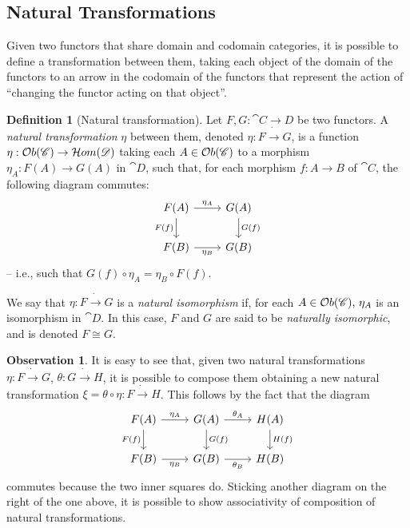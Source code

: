 \documentclass[a4paper, twoside,openright]{report}
\theoremstyle{plain}
\theoremstyle{definition}
\newtheorem{definition}[theorem]{Definition}
\newtheorem{obs}[theorem]{Observation}
\begin{document}
\subsection{Natural Transformations}

Given two functors that share domain and codomain categories, it is possible to define a transformation between them, taking each object of the domain of the functors to an arrow in the codomain of the functors that represent the action of ``changing the functor acting on that object''.

\begin{definition}[Natural transformation]
    Let $F,G : \cat {C \rightarrow D}$ be two functors. A \emph{natural transformation} $\eta$ between them, denoted $\eta: F \dot\rightarrow G$, is a function $\eta: \mathcal{O}b(\mathscr{C}) \rightarrow \mathcal{H}om(\mathscr{D})$ taking each $A \in \mathcal{O}b(\mathscr{C})$ to a morphism $\eta_A:F(A) \rightarrow G(A)$ in $\cat{D}$, such that, for each morphism $f: A \rightarrow B$ of $\cat C$, the following diagram commutes:
    \[
        \begin{tikzcd}
            F(A) \arrow[d, "F(f)" swap] \arrow[r, "{\eta_A}"] & G(A) \arrow[d, "G(f)"] \\
            F(B) \arrow[r, "{\eta_B}"swap] & G(B)
        \end{tikzcd}
    \]
    -- i.e., such that $G(f) \circ \eta_A = \eta_B \circ F(f)$.

    We say that $\eta: F \dot\rightarrow G$ is a \emph{natural isomorphism} if, for each $A \in \mathcal{O}b(\mathscr{C}) \text{, } \eta_A$ is an isomorphism in $\cat D$. In this case, $F$ and $G$ are said to be \emph{naturally isomorphic}, and is denoted $F \cong G$.    
\end{definition}

\begin{obs}\label{obs:comp_assoc_nat_tran}
It is easy to see that, given two natural transformations $\eta:F\dot\rightarrow G$, $\theta: G \dot\rightarrow H$, it is possible to compose them obtaining a new natural transformation $\xi = \theta \circ \eta : F \dot \rightarrow H$. This follows by the fact that the diagram
\[
        \begin{tikzcd}
            F(A) \arrow[d, "F(f)" swap] \arrow[r, "{\eta_A}"] 
                & G(A) \arrow[d, "G(f)"] \arrow[r, "{\theta_A}"]
                & H(A) \arrow[d, "H(f)"] \\
            F(B) \arrow[r, "{\eta_B}"swap]
                & G(B) \arrow[r, "{\theta_B}" swap]
                & H(B)
        \end{tikzcd}
\]
commutes because the two inner squares do. Sticking another diagram on the right of the one above, it is possible to show associativity of composition of natural transformations.
\end{obs}
\end{document}
